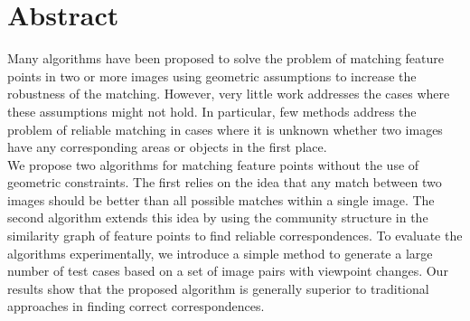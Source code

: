 

\cleardoublepage
\chapter*{Abstract}
Many algorithms have been proposed to solve the problem of matching 
feature points in two or more images using geometric assumptions to 
increase the robustness of the matching. However, very little work 
addresses the cases where these assumptions might not hold. In 
particular, few methods address the problem of reliable matching in 
cases where it is unknown whether two images have any corresponding 
areas or objects in the first place.  \\

We propose two algorithms for matching feature points without the use of 
geometric constraints. The first relies on the idea that any match 
between two images should be better than all possible matches within a 
single image. The second algorithm extends this idea by using the 
community structure in the similarity graph of feature points to find 
reliable correspondences. To evaluate the algorithms experimentally, we 
introduce a simple method to generate a large number of test cases based 
on a set of image pairs with viewpoint changes. Our results show that 
the proposed algorithm is generally superior to traditional approaches 
in finding correct correspondences.
